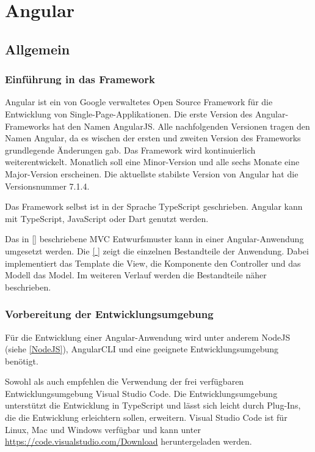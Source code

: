 
\chapter{Angular}
\label{ch:angular}

\section{Allgemein}

\subsection{Einführung in das Framework}
Angular ist ein von Google verwaltetes Open Source Framework für die Entwicklung von Single-Page-Applikationen. Die erste Version des Angular-Frameworks hat den Namen AngularJS. Alle nachfolgenden Versionen tragen den Namen Angular, da es wischen der ersten und zweiten Version des Frameworks grundlegende Änderungen gab. Das Framework wird kontinuierlich weiterentwickelt. Monatlich soll eine Minor-Version und alle sechs Monate eine Major-Version erscheinen. Die aktuellste stabilste Version von Angular hat die Versionsnummer 7.1.4. \autocites[vgl.][vii\psqq]{Woiwode.2018}[vgl.][3\psqq]{Freeman.2018}

Das Framework selbst ist in der Sprache TypeScript geschrieben. Angular kann mit TypeScript, JavaScript oder Dart genutzt werden. \autocites[vgl.][vii\psq]{Woiwode.2018}[vgl.][13]{Steyer.2017}

Das in \autoref{} beschriebene MVC Entwurfsmuster kann in einer Angular-Anwendung umgesetzt werden. Die \autoref{ } zeigt die einzelnen Bestandteile der Anwendung. Dabei implementiert das Template die View, die Komponente den Controller und das Modell das Model. \autocite[vgl.][34\psqq]{Freeman.2018} Im weiteren Verlauf werden die Bestandteile näher beschrieben. 



\subsection{Vorbereitung der Entwicklungsumgebung}
Für die Entwicklung einer Angular-Anwendung wird unter anderem NodeJS (siehe \autoref{NodeJS}), AngularCLI und eine geeignete Entwicklungsumgebung benötigt.  

Sowohl \textcite[vgl.][3\psqq]{Woiwode.2018} als auch \textcite[vgl.][3\psqq]{Steyer.2017} empfehlen die Verwendung der frei verfügbaren Entwicklungsumgebung Visual Studio Code. Die Entwicklungsumgebung unterstützt die Entwicklung in TypeScript und lässt sich leicht durch Plug-Ins, die die Entwicklung erleichtern sollen, erweitern. Visual Studio Code ist für Linux, Mac und Windows verfügbar und kann unter \url{https://code.visualstudio.com/Download}  heruntergeladen werden.

